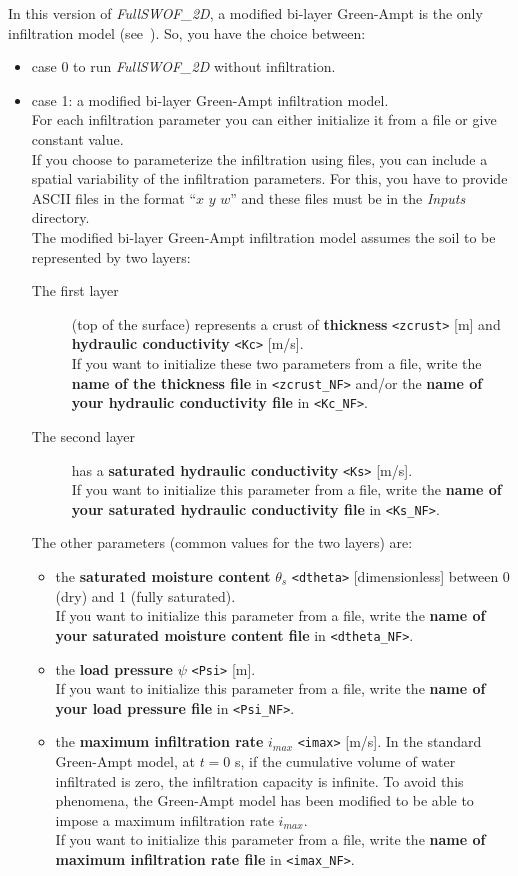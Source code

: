 \documentclass[a4paper, 11pt]{article}
\newcommand{\FullSWOF}{\emph{FullSWOF\_2D}}
\begin{document}
In this version of \FullSWOF, a modified bi-layer Green-Ampt is the only infiltration model (see~\cite{Esteves00}).
So, you have the choice between:
\begin{itemize}
\item case 0 to run \FullSWOF{} without infiltration. 
\item case 1: a modified bi-layer Green-Ampt infiltration model.\\
For each infiltration parameter you can either initialize it from a file or give constant value.\\
If you choose to parameterize the infiltration using files, you can include a spatial variability of the infiltration parameters. For this, you have to provide ASCII files in the format ``$x$ $y$ $w$'' and these files must be in the \textit{Inputs} directory.\\
The modified bi-layer Green-Ampt infiltration model assumes the soil to be represented by two layers:
\begin{description}
\item[The first layer] (top of the surface) represents a crust of \textbf{thickness} \texttt{<zcrust>} [m] and \textbf{hydraulic conductivity} \texttt{<Kc>} [m/s].\\
If you want to initialize these two parameters from a file, write the \textbf{name of the thickness file} in \texttt{<zcrust\_NF>} and/or the \textbf{name of your hydraulic conductivity file} in \texttt{<Kc\_NF>}.
\item[The second layer] has a \textbf{saturated hydraulic conductivity} \texttt{<Ks>} [m/s].\\ 
If you want to initialize this parameter from a file, write the \textbf{name of your saturated hydraulic conductivity file} in \texttt{<Ks\_NF>}.
\end{description}
The other parameters (common values for the two layers) are:
\begin{itemize}
	\item the \textbf{saturated moisture content} \textbf{$\theta_s$} \texttt{<dtheta>} [dimensionless] between 0 (dry) and 1 (fully saturated).\\
          If you want to initialize this parameter from a file, write the \textbf{name of your saturated moisture content file} in \texttt{<dtheta\_NF>}.
	\item the \textbf{load pressure} \textbf{$\psi$} \texttt{<Psi>} [m].\\
          If you want to initialize this parameter from a file, write the \textbf{name of your load pressure file} in \texttt{<Psi\_NF>}.
	\item the \textbf{maximum infiltration rate} $i_{max}$ \texttt{<imax>} [m/s].  In the standard Green-Ampt model, at $t=0$ s, if the cumulative volume of water infiltrated is zero, the infiltration capacity is infinite. To avoid this phenomena, the Green-Ampt model has been modified to be able to impose a maximum infiltration rate $i_{max}$.\\
         If you want to initialize this parameter from a file, write the \textbf{name of maximum infiltration rate file} in \texttt{<imax\_NF>}.


\end{itemize}
\end{itemize}
\end{document}
